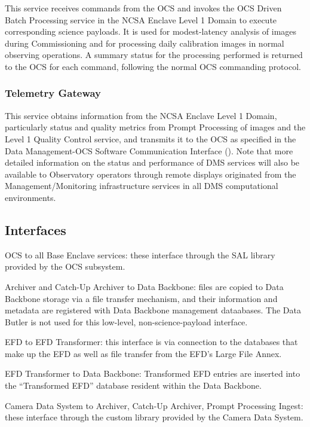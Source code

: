 \documentclass[DM,lsstdraft,toc]{lsstdoc}
\begin{document}
This service receives commands from the OCS and invokes the OCS Driven
Batch Processing service in the NCSA Enclave Level 1 Domain to execute
corresponding science payloads. It is used for modest-latency analysis
of images during Commissioning and for processing daily calibration
images in normal observing operations. A summary status for the
processing performed is returned to the OCS for each command, following
the normal OCS commanding protocol.

\subsubsection{Telemetry Gateway}\label{telemetry-gateway}

This service obtains information from the NCSA Enclave Level 1 Domain,
particularly status and quality metrics from Prompt Processing of images
and the Level 1 Quality Control service, and transmits it to the OCS as
specified in the Data Management-OCS Software Communication Interface
(). Note that more detailed information on the status and
performance of DMS services will also be available to Observatory
operators through remote displays originated from the
Management/Monitoring infrastructure services in all DMS computational
environments.

\subsection{Interfaces}\label{base-interfaces}

OCS to all Base Enclave services: these interface through the SAL
library provided by the OCS subsystem.

Archiver and Catch-Up Archiver to Data Backbone: files are copied to
Data Backbone storage via a file transfer mechanism, and their
information and metadata are registered with Data Backbone management
dataabases. The Data Butler is not used for this low-level,
non-science-payload interface.

EFD to EFD Transformer: this interface is via connection to the
databases that make up the EFD as well as file transfer from the EFD's
Large File Annex.

EFD Transformer to Data Backbone: Transformed EFD entries are inserted
into the ``Transformed EFD'' database resident within the Data Backbone.

Camera Data System to Archiver, Catch-Up Archiver, Prompt Processing
Ingest: these interface through the custom library provided by the
Camera Data System.
\end{document}
